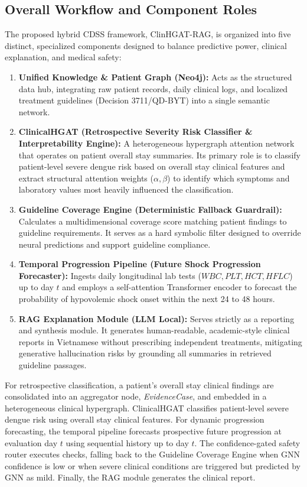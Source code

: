 \documentclass[conference]{IEEEtran}
\begin{document}
\subsection{Overall Workflow and Component Roles}
The proposed hybrid CDSS framework, ClinHGAT-RAG, is organized into five distinct, specialized components designed to balance predictive power, clinical explanation, and medical safety:
\begin{enumerate}
    \item \textbf{Unified Knowledge \& Patient Graph (Neo4j):} Acts as the structured data hub, integrating raw patient records, daily clinical logs, and localized treatment guidelines (Decision 3711/QD-BYT) into a single semantic network.
    \item \textbf{ClinicalHGAT (Retrospective Severity Risk Classifier \& Interpretability Engine):} A heterogeneous hypergraph attention network that operates on patient overall stay summaries. Its primary role is to classify patient-level severe dengue risk based on overall stay clinical features and extract structural attention weights ($\alpha, \beta$) to identify which symptoms and laboratory values most heavily influenced the classification.
    \item \textbf{Guideline Coverage Engine (Deterministic Fallback Guardrail):} Calculates a multidimensional coverage score matching patient findings to guideline requirements. It serves as a hard symbolic filter designed to override neural predictions and support guideline compliance.
    \item \textbf{Temporal Progression Pipeline (Future Shock Progression Forecaster):} Ingests daily longitudinal lab tests ($WBC, PLT, HCT, HFLC$) up to day $t$ and employs a self-attention Transformer encoder to forecast the probability of hypovolemic shock onset within the next 24 to 48 hours.
    \item \textbf{RAG Explanation Module (LLM Local):} Serves strictly as a reporting and synthesis module. It generates human-readable, academic-style clinical reports in Vietnamese without prescribing independent treatments, mitigating generative hallucination risks by grounding all summaries in retrieved guideline passages.
\end{enumerate}

For retrospective classification, a patient's overall stay clinical findings are consolidated into an aggregator node, \textit{EvidenceCase}, and embedded in a heterogeneous clinical hypergraph. ClinicalHGAT classifies patient-level severe dengue risk using overall stay clinical features. For dynamic progression forecasting, the temporal pipeline forecasts prospective future progression at evaluation day $t$ using sequential history up to day $t$. The confidence-gated safety router executes checks, falling back to the Guideline Coverage Engine when GNN confidence is low or when severe clinical conditions are triggered but predicted by GNN as mild. Finally, the RAG module generates the clinical report.
\end{document}

